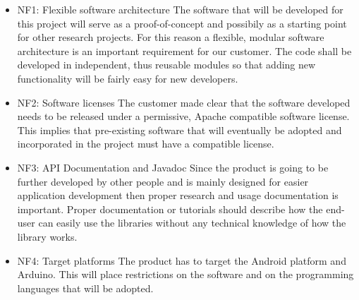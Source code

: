 \begin{itemize}
\item{NF1: Flexible software architecture}\newline
The software that will be developed for this project will serve as
a proof-of-concept and possibily as a starting point for other research
projects. For this reason a flexible, modular software architecture
is an important requirement for our customer. The code shall be developed
in independent, thus reusable modules so that adding new functionality
will be fairly easy for new developers.

\item{NF2: Software licenses}\newline
The customer made clear that the software developed needs to be released
under a permissive, Apache compatible software license. This implies
that pre-existing software that will eventually be adopted and incorporated
in the project must have a compatible license.

\item{NF3: API Documentation and Javadoc}\newline
Since the product is going to be further developed by other people and is
mainly designed for easier application development then proper research and usage
documentation is important. Proper documentation or tutorials should describe how
the end-user can easily use the libraries without any technical knowledge of how
the library works.

\item{NF4: Target platforms}\newline
The product has to target the Android platform and Arduino.
This will place restrictions on the software and on the programming languages that will be adopted.
\end{itemize}

\newpage
\
